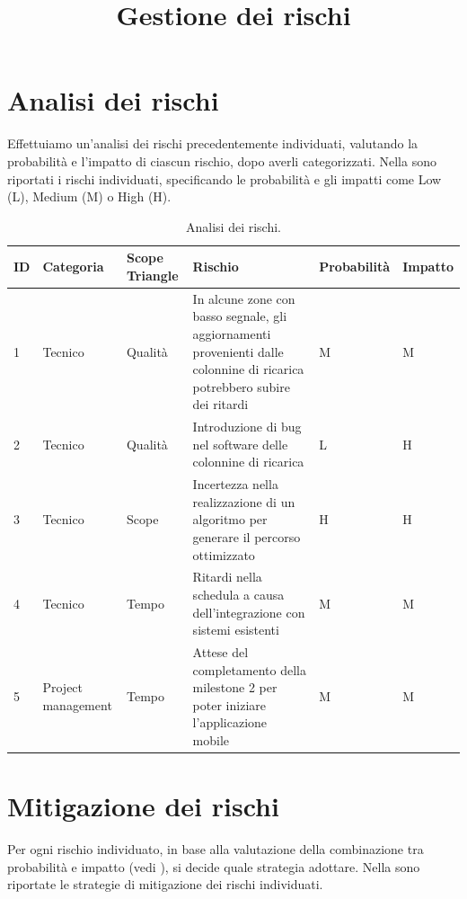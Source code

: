 \documentclass[a4paper,12pt]{article}
\title{\textbf{Gestione dei rischi}}
\author{}
\date{}
\begin{document}
\maketitle
\tableofcontents

\newpage

\section{Analisi dei rischi}
Effettuiamo un'analisi dei rischi precedentemente individuati, valutando la probabilità e l'impatto di ciascun rischio,
dopo averli categorizzati. Nella  sono riportati i rischi individuati, specificando le
probabilità e gli impatti come Low (L), Medium (M) o High (H).
\begin{table}[!htb]
    \centering
    \begin{tabular}{|p{}|p{}|p{}|p{}|p{}|p{}|}
        \hline
        \textbf{ID} & \textbf{Categoria} & \textbf{Scope Triangle} & \textbf{Rischio} & \textbf{Probabilità} & \textbf{Impatto} \\ \hline
        1 & Tecnico & Qualità & In alcune zone con basso segnale, gli aggiornamenti provenienti dalle colonnine di
        ricarica potrebbero subire dei ritardi & M & M \\ \hline
        2 & Tecnico & Qualità & Introduzione di bug nel software delle colonnine di ricarica & L & H \\ \hline
        3 & Tecnico & Scope & Incertezza nella realizzazione di un algoritmo per generare il percorso ottimizzato & H & H \\ \hline
        4 & Tecnico & Tempo & Ritardi nella schedula a causa dell'integrazione con sistemi esistenti & M & M \\ \hline
        5 & Project management & Tempo & Attese del completamento della milestone 2 per poter iniziare l'applicazione mobile & M & M \\ \hline
    \end{tabular}
    \caption{Analisi dei rischi.}
    \label{tab:risk_analysis}
\end{table}

\newpage

\section{Mitigazione dei rischi}
Per ogni rischio individuato, in base alla valutazione della combinazione tra probabilità e impatto (vedi
), si decide quale strategia adottare. Nella  sono riportate le
strategie di mitigazione dei rischi individuati.
\end{document}
